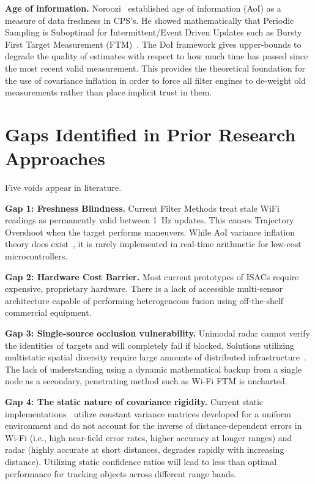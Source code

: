 \textbf{Age of information.} Noroozi~\cite{noroozi_aoi} established age of information (AoI) as a measure of data freshness in CPS's. He showed mathematically that Periodic Sampling is Suboptimal for Intermittent/Event Driven Updates such as Bursty First Target Measurement (FTM)~\cite{noroozi_aoi}. The DoI framework gives upper-bounds to degrade the quality of estimates with respect to how much time has passed since the most recent valid measurement. This provides the theoretical foundation for the use of covariance inflation in order to force all filter engines to de-weight old measurements rather than place implicit trust in them.

\section{Gaps Identified in Prior Research Approaches}
\label{sec:gaps}

Five voids appear in literature.

\textbf{Gap 1: Freshness Blindness.} Current Filter Methods treat stale WiFi readings as permanently valid between 1~Hz updates. This causes Trajectory Overshoot when the target performs maneuvers. While AoI variance inflation theory does exist~\cite{noroozi_aoi}, it is rarely implemented in real-time arithmetic for low-cost microcontrollers.

\textbf{Gap 2: Hardware Cost Barrier.} Most current prototypes of ISACs require expensive, proprietary hardware. There is a lack of accessible multi-sensor architecture capable of performing heterogeneous fusion using off-the-shelf commercial equipment.

\textbf{Gap 3: Single-source occlusion vulnerability.} Unimodal radar cannot verify the identities of targets and will completely fail if blocked. Solutions utilizing multistatic spatial diversity require large amounts of distributed infrastructure~\cite{pegoraro_asymov}. The lack of understanding using a dynamic mathematical backup from a single node as a secondary, penetrating method such as Wi-Fi FTM is uncharted.

\textbf{Gap 4: The static nature of covariance rigidity.} Current static implementations~\cite{chen_ci,yang_heterogeneous} utilize constant variance matrices developed for a uniform environment and do not account for the inverse of distance-dependent errors in Wi-Fi (i.e., high near-field error rates, higher accuracy at longer ranges) and radar (highly accurate at short distances, degrades rapidly with increasing distance). Utilizing static confidence ratios will lead to less than optimal performance for tracking objects across different range bands.

